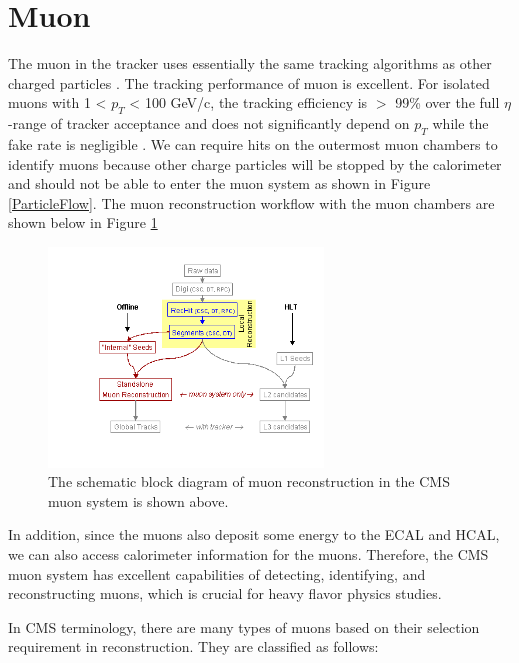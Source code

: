 \section{Muon}

The muon in the tracker uses essentially the same tracking algorithms as other charged particles \cite{CMSTrackComp}. The tracking performance of muon is excellent. For isolated muons with 1 < $p_T$ < 100 GeV/c, the tracking efficiency is $>$ 99\% over the full $\eta$-range of tracker acceptance and does not significantly depend on $p_T$ while the fake rate is negligible \cite{CMSTrackComp}. We can require hits on the outermost muon chambers to identify muons because other charge particles will be stopped by the calorimeter and should not be able to enter the muon system as shown in Figure \ref{ParticleFlow}. The muon reconstruction workflow with the muon chambers are shown below in Figure \ref{MuonReco}


\begin{figure}[hbtp]
\begin{center}
\includegraphics[width=0.65\textwidth]{Figures/Chapter4/MuonReco.png}
\caption{The schematic block diagram of muon reconstruction in the CMS muon system is shown above.}
\label{MuonReco}
\end{center}
\end{figure} 

In addition, since the muons also deposit some energy to the ECAL and HCAL, we can also access calorimeter information for the muons. Therefore, the CMS muon system has excellent capabilities of detecting, identifying, and reconstructing muons, which is crucial for heavy flavor physics studies. 

In CMS terminology, there are many types of muons based on their selection requirement in reconstruction. They are classified as follows:


